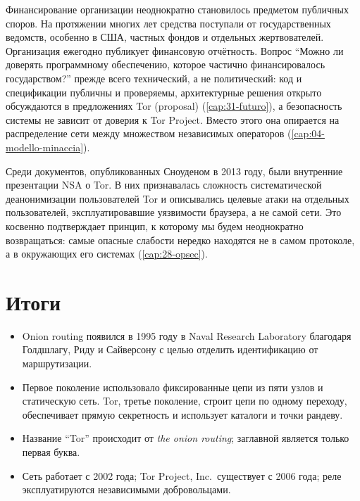 Финансирование организации неоднократно становилось предметом публичных споров. На протяжении многих лет средства поступали от государственных ведомств, особенно в США, частных фондов и отдельных жертвователей. Организация ежегодно публикует финансовую отчётность. Вопрос \enquote{Можно ли доверять программному обеспечению, которое частично финансировалось государством?} прежде всего технический, а не политический: код и спецификации публичны и проверяемы, архитектурные решения открыто обсуждаются в предложениях Tor (proposal) (\cref{cap:31-futuro}), а безопасность системы не зависит от доверия к Tor Project. Вместо этого она опирается на распределение сети между множеством независимых операторов (\cref{cap:04-modello-minaccia}).

\begin{approfondimento}
Среди документов, опубликованных Сноуденом в 2013 году, были внутренние презентации NSA о Tor. В них признавалась сложность систематической деанонимизации пользователей Tor и описывались целевые атаки на отдельных пользователей, эксплуатировавшие уязвимости браузера, а не самой сети. Это косвенно подтверждает принцип, к которому мы будем неоднократно возвращаться: самые опасные слабости нередко находятся не в самом протоколе, а в окружающих его системах (\cref{cap:28-opsec}).
\end{approfondimento}

\section*{Итоги}
\begin{itemize}
  \item Onion routing появился в 1995 году в Naval Research Laboratory благодаря Голдшлагу, Риду и Сайверсону с целью отделить идентификацию от маршрутизации.
  \item Первое поколение использовало фиксированные цепи из пяти узлов и статическую сеть. Tor, третье поколение, строит цепи по одному переходу, обеспечивает прямую секретность и использует каталоги и точки рандеву.
  \item Название \enquote{Tor} происходит от \emph{the onion routing}; заглавной является только первая буква.
  \item Сеть работает с 2002 года; Tor Project, Inc.\ существует с 2006 года; реле эксплуатируются независимыми добровольцами.
\end{itemize}

